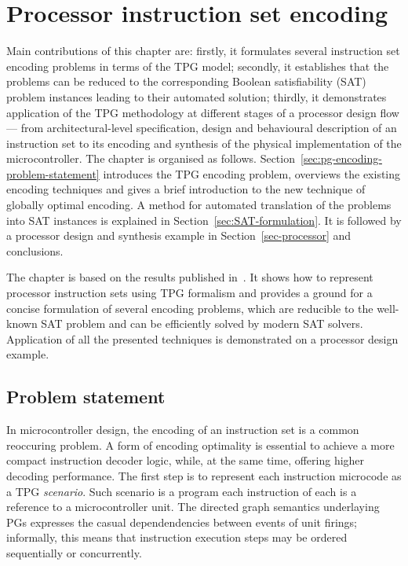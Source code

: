 
\chapter{Processor instruction set encoding\label{chap:PGEncoding}}

Main contributions of this chapter are: firstly, it formulates several
instruction set encoding problems in terms of the TPG model; secondly,
it establishes that the problems can be reduced to the corresponding Boolean satisfiability (SAT) problem instances
leading to their automated solution; thirdly, it demonstrates application
of the TPG methodology at different stages of a processor design
flow --- from architectural-level specification, design and behavioural
description of an instruction set to its encoding and synthesis of
the physical implementation of the microcontroller. The chapter is organised
as follows. Section~\ref{sec:pg-encoding-problem-statement} introduces
the TPG encoding problem, overviews the existing encoding techniques and gives
a brief introduction to the new technique of globally optimal encoding.
A method for automated translation of the problems into SAT instances
is explained in Section~\ref{sec:SAT-formulation}. It is followed
by a processor design and synthesis example in Section~\ref{sec-processor} and
conclusions.

The chapter is based on the results published in~\cite{cpog_encoding}. It shows how to represent processor instruction sets using TPG formalism and provides
a ground for a concise formulation of several encoding problems, which
are reducible to the well-known SAT problem
and can be efficiently solved by modern SAT solvers. Application of
all the presented techniques is demonstrated on a processor design
example.



\section{Problem statement\label{sec:pg-encoding-problem-statement}}
In microcontroller design, the encoding of an instruction set is a common reoccuring problem. A form of encoding optimality is essential to achieve a more compact instruction decoder logic, while, at the same time, offering higher decoding performance. The first step is to represent each instruction microcode as a TPG \emph{scenario}. Such scenario is a program each instruction of each is a reference to a microcontroller unit. The directed graph semantics underlaying PGs expresses the casual dependendencies between events of unit firings; informally, this means that instruction execution steps may be ordered sequentially or concurrently.   


